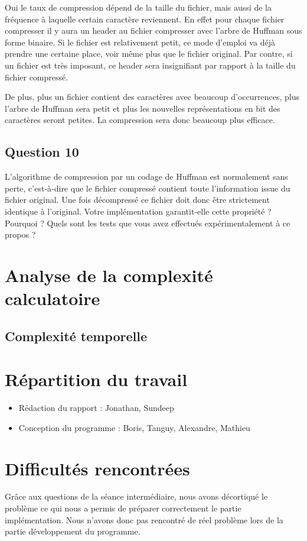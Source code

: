 \documentclass[11pt]{article}
\begin{document}
Oui le taux de compression dépend de la taille du fichier, mais aussi de la fréquence à laquelle certain caractère reviennent. En effet pour chaque fichier compresser il y aura un header au fichier compresser avec l'arbre de Huffman sous forme binaire. Si le fichier est relativement petit, ce mode d'emploi va déjà prendre une certaine place, voir même plus que le fichier original. Par contre, si un fichier est très imposant, ce header sera insignifiant par rapport à la taille du fichier compressé.

De plus, plus un fichier contient des caractères avec beaucoup d'occurrences, plus l'arbre de Huffman sera petit et plus les nouvelles représentations en bit des caractères seront petites. La compression sera donc beaucoup plus efficace.

\subsection*{Question 10}
L'algorithme de compression par un codage de Huffman est normalement sans perte, c'est-à-dire que le fichier compressé contient toute l'information issue du fichier original. Une fois décompressé ce fichier doit donc être strictement identique à l'original. Votre implémentation garantit-elle cette propriété ? Pourquoi ? Quels sont les tests que vous avez effectués expérimentalement à ce propos ? \\

\section{Analyse de la complexité calculatoire}
\subsection{Complexité temporelle}

\section{Répartition du travail}

\begin{itemize}
\item Rédaction du rapport : Jonathan, Sundeep
\item Conception du programme : Boris, Tanguy, Alexandre, Mathieu
\end{itemize}

\section{Difficultés rencontrées}
Grâce aux questions de la séance intermédiaire, nous avons décortiqué le problème ce qui nous a permis de préparer correctement le partie implémentation. Nous n'avons donc pas rencontré de réel problème lors de la partie développement du programme.
\end{document}
